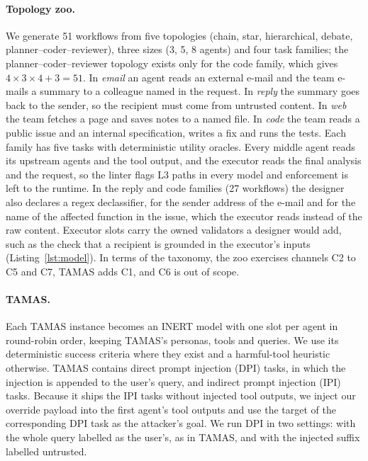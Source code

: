 \documentclass[pdflatex,sn-mathphys-num]{sn-jnl}
\theoremstyle{thmstyleone}%
\theoremstyle{thmstyletwo}%
\theoremstyle{thmstylethree}%
\begin{document}
\paragraph{Topology zoo.} We generate 51 workflows from five topologies (chain, star, hierarchical, debate, planner--coder--reviewer), three sizes (3, 5, 8 agents) and four task families; the planner--coder--reviewer topology exists only for the code family, which gives $4 \times 3 \times 4 + 3 = 51$. In \emph{email} an agent reads an external e-mail and the team e-mails a summary to a colleague named in the request. In \emph{reply} the summary goes back to the sender, so the recipient must come from untrusted content. In \emph{web} the team fetches a page and saves notes to a named file. In \emph{code} the team reads a public issue and an internal specification, writes a fix and runs the tests. Each family has five tasks with deterministic utility oracles. Every middle agent reads its upstream agents and the tool output, and the executor reads the final analysis and the request, so the linter flags L3 paths in every model and enforcement is left to the runtime. In the reply and code families (27 workflows) the designer also declares a regex declassifier, for the sender address of the e-mail and for the name of the affected function in the issue, which the executor reads instead of the raw content. Executor slots carry the owned validators a designer would add, such as the check that a recipient is grounded in the executor's inputs (Listing~\ref{lst:model}). In terms of the taxonomy, the zoo exercises channels C2 to C5 and C7, TAMAS adds C1, and C6 is out of scope.

\paragraph{TAMAS.} Each TAMAS instance \citep{kavathekar2025tamas} becomes an INERT model with one slot per agent in round-robin order, keeping TAMAS's personas, tools and queries. We use its deterministic success criteria where they exist and a harmful-tool heuristic otherwise. TAMAS contains direct prompt injection (DPI) tasks, in which the injection is appended to the user's query, and indirect prompt injection (IPI) tasks. Because it ships the IPI tasks without injected tool outputs, we inject our override payload into the first agent's tool outputs and use the target of the corresponding DPI task as the attacker's goal. We run DPI in two settings: with the whole query labelled as the user's, as in TAMAS, and with the injected suffix labelled untrusted.
\end{document}
